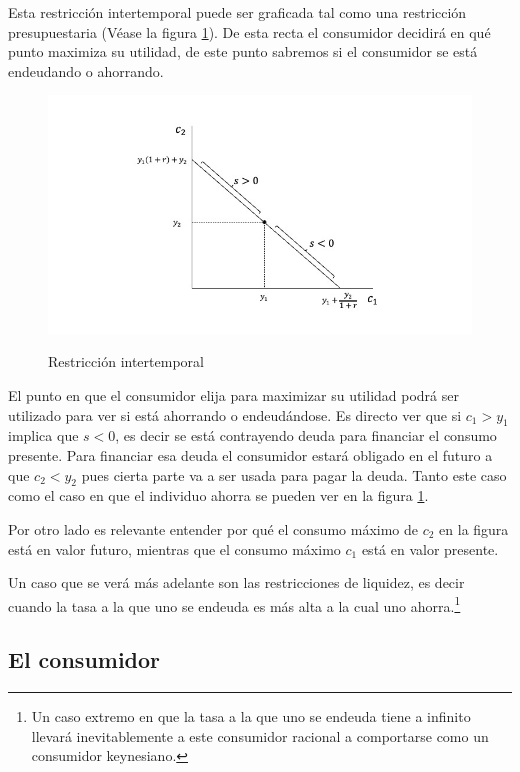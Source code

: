 Esta restricción intertemporal puede ser graficada tal como una restricción presupuestaria (Véase la figura \ref{fig: restricción intertemporal}). De esta recta el consumidor decidirá en qué punto maximiza su utilidad, de este punto sabremos si el consumidor se está endeudando o ahorrando. 
\begin{figure}
    \centering
    \caption{Restricción intertemporal}
    \includegraphics[width=\textwidth]{Figuras/CI Restriccion intertemporal.jpeg}
    \label{fig: restricción intertemporal}
\end{figure}

El punto en que el consumidor elija para maximizar su utilidad podrá ser utilizado para ver si está ahorrando o endeudándose. Es directo ver que si $c_1>y_1$ implica que $s<0$, es decir se está contrayendo deuda para financiar el consumo presente. Para financiar esa deuda el consumidor estará obligado en el futuro a que $c_2<y_2$ pues cierta parte va a ser usada para pagar la deuda. Tanto este caso como el caso en que el individuo ahorra se pueden ver en la figura \ref{fig: restricción intertemporal}.

Por otro lado es relevante entender por qué el consumo máximo de $c_2$ en la figura está en valor futuro, mientras que el consumo máximo $c_1$ está en valor presente. 

Un caso que se verá más adelante son las restricciones de liquidez, es decir cuando la tasa a la que uno se endeuda es más alta a la cual uno ahorra.\footnote{Un caso extremo en que la tasa a la que uno se endeuda tiene a infinito llevará inevitablemente a este consumidor racional a comportarse como un consumidor keynesiano.} 

\subsection{El consumidor}

